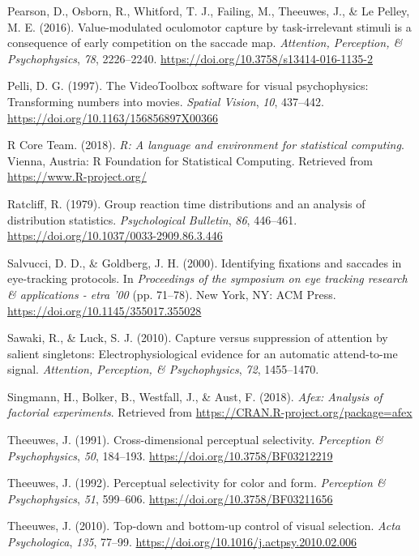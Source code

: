 \documentclass[man, a4paper, noextraspace, 11pt,floatsintext]{apa6}
\theoremstyle{definition}
\theoremstyle{definition}
\theoremstyle{definition}
\theoremstyle{remark}
\begin{document}
\hypertarget{ref-Pearson2016}{}
Pearson, D., Osborn, R., Whitford, T. J., Failing, M., Theeuwes, J., \&
Le Pelley, M. E. (2016). Value-modulated oculomotor capture by
task-irrelevant stimuli is a consequence of early competition on the
saccade map. \emph{Attention, Perception, \& Psychophysics}, \emph{78},
2226--2240. \url{https://doi.org/10.3758/s13414-016-1135-2}

\hypertarget{ref-Pelli1997}{}
Pelli, D. G. (1997). The VideoToolbox software for visual psychophysics:
Transforming numbers into movies. \emph{Spatial Vision}, \emph{10},
437--442. \url{https://doi.org/10.1163/156856897X00366}

\hypertarget{ref-R-base}{}
R Core Team. (2018). \emph{R: A language and environment for statistical
computing}. Vienna, Austria: R Foundation for Statistical Computing.
Retrieved from \url{https://www.R-project.org/}

\hypertarget{ref-Ratcliff1979}{}
Ratcliff, R. (1979). Group reaction time distributions and an analysis
of distribution statistics. \emph{Psychological Bulletin}, \emph{86},
446--461. \url{https://doi.org/10.1037/0033-2909.86.3.446}

\hypertarget{ref-Salvucci2000}{}
Salvucci, D. D., \& Goldberg, J. H. (2000). Identifying fixations and
saccades in eye-tracking protocols. In \emph{Proceedings of the
symposium on eye tracking research \& applications - etra '00} (pp.
71--78). New York, NY: ACM Press.
\url{https://doi.org/10.1145/355017.355028}

\hypertarget{ref-Sawaki2010}{}
Sawaki, R., \& Luck, S. J. (2010). Capture versus suppression of
attention by salient singletons: Electrophysiological evidence for an
automatic attend-to-me signal. \emph{Attention, Perception, \&
Psychophysics}, \emph{72}, 1455--1470.

\hypertarget{ref-R-afex}{}
Singmann, H., Bolker, B., Westfall, J., \& Aust, F. (2018). \emph{Afex:
Analysis of factorial experiments}. Retrieved from
\url{https://CRAN.R-project.org/package=afex}

\hypertarget{ref-Theeuwes1991a}{}
Theeuwes, J. (1991). Cross-dimensional perceptual selectivity.
\emph{Perception \& Psychophysics}, \emph{50}, 184--193.
\url{https://doi.org/10.3758/BF03212219}

\hypertarget{ref-Theeuwes1992}{}
Theeuwes, J. (1992). Perceptual selectivity for color and form.
\emph{Perception \& Psychophysics}, \emph{51}, 599--606.
\url{https://doi.org/10.3758/BF03211656}

\hypertarget{ref-Theeuwes2010}{}
Theeuwes, J. (2010). Top-down and bottom-up control of visual selection.
\emph{Acta Psychologica}, \emph{135}, 77--99.
\url{https://doi.org/10.1016/j.actpsy.2010.02.006}
\end{document}
